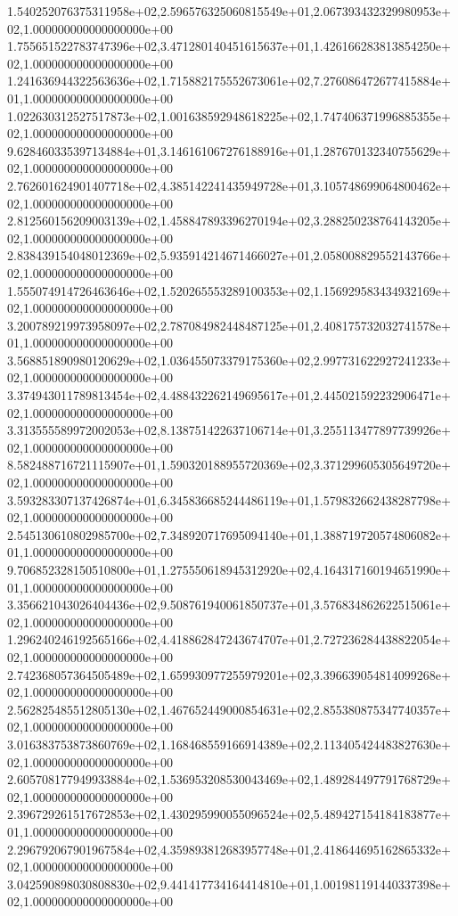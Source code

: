 1.540252076375311958e+02,2.596576325060815549e+01,2.067393432329980953e+02,1.000000000000000000e+00
1.755651522783747396e+02,3.471280140451615637e+01,1.426166283813854250e+02,1.000000000000000000e+00
1.241636944322563636e+02,1.715882175552673061e+02,7.276086472677415884e+01,1.000000000000000000e+00
1.022630312527517873e+02,1.001638592948618225e+02,1.747406371996885355e+02,1.000000000000000000e+00
9.628460335397134884e+01,3.146161067276188916e+01,1.287670132340755629e+02,1.000000000000000000e+00
2.762601624901407718e+02,4.385142241435949728e+01,3.105748699064800462e+02,1.000000000000000000e+00
2.812560156209003139e+02,1.458847893396270194e+02,3.288250238764143205e+02,1.000000000000000000e+00
2.838439154048012369e+02,5.935914214671466027e+01,2.058008829552143766e+02,1.000000000000000000e+00
1.555074914726463646e+02,1.520265553289100353e+02,1.156929583434932169e+02,1.000000000000000000e+00
3.200789219973958097e+02,2.787084982448487125e+01,2.408175732032741578e+01,1.000000000000000000e+00
3.568851890980120629e+02,1.036455073379175360e+02,2.997731622927241233e+02,1.000000000000000000e+00
3.374943011789813454e+02,4.488432262149695617e+01,2.445021592232906471e+02,1.000000000000000000e+00
3.313555589972002053e+02,8.138751422637106714e+01,3.255113477897739926e+02,1.000000000000000000e+00
8.582488716721115907e+01,1.590320188955720369e+02,3.371299605305649720e+02,1.000000000000000000e+00
3.593283307137426874e+01,6.345836685244486119e+01,1.579832662438287798e+02,1.000000000000000000e+00
2.545130610802985700e+02,7.348920717695094140e+01,1.388719720574806082e+01,1.000000000000000000e+00
9.706852328150510800e+01,1.275550618945312920e+02,4.164317160194651990e+01,1.000000000000000000e+00
3.356621043026404436e+02,9.508761940061850737e+01,3.576834862622515061e+02,1.000000000000000000e+00
1.296240246192565166e+02,4.418862847243674707e+01,2.727236284438822054e+02,1.000000000000000000e+00
2.742368057364505489e+02,1.659930977255979201e+02,3.396639054814099268e+02,1.000000000000000000e+00
2.562825485512805130e+02,1.467652449000854631e+02,2.855380875347740357e+02,1.000000000000000000e+00
3.016383753873860769e+02,1.168468559166914389e+02,2.113405424483827630e+02,1.000000000000000000e+00
2.605708177949933884e+02,1.536953208530043469e+02,1.489284497791768729e+02,1.000000000000000000e+00
2.396729261517672853e+02,1.430295990055096524e+02,5.489427154184183877e+01,1.000000000000000000e+00
2.296792067901967584e+02,4.359893812683957748e+01,2.418644695162865332e+02,1.000000000000000000e+00
3.042590898030808830e+02,9.441417734164414810e+01,1.001981191440337398e+02,1.000000000000000000e+00
